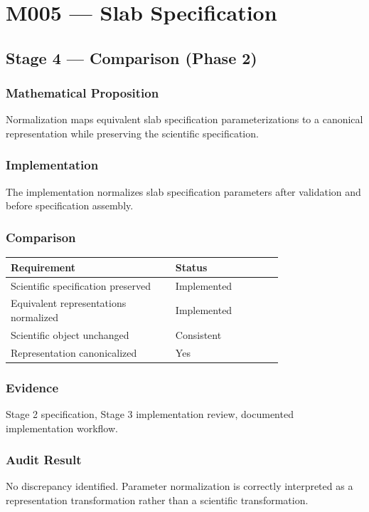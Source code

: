 \chapter{M005 --- Slab Specification}

\section{Stage 4 --- Comparison (Phase 2)}

\subsection{Mathematical Proposition}

Normalization maps equivalent slab specification parameterizations to a
canonical representation while preserving the scientific specification.

\subsection{Implementation}

The implementation normalizes slab specification parameters after
validation and before specification assembly.

\subsection{Comparison}

\begin{center}
\begin{tabular}{|p{0.46\linewidth}|p{0.30\linewidth}|}
\hline
Requirement & Status\\
\hline
Scientific specification preserved & Implemented\\
Equivalent representations normalized & Implemented\\
Scientific object unchanged & Consistent\\
Representation canonicalized & Yes\\
\hline
\end{tabular}
\end{center}

\subsection{Evidence}

Stage 2 specification, Stage 3 implementation review, documented
implementation workflow.

\subsection{Audit Result}

No discrepancy identified. Parameter normalization is correctly
interpreted as a representation transformation rather than a scientific
transformation.
